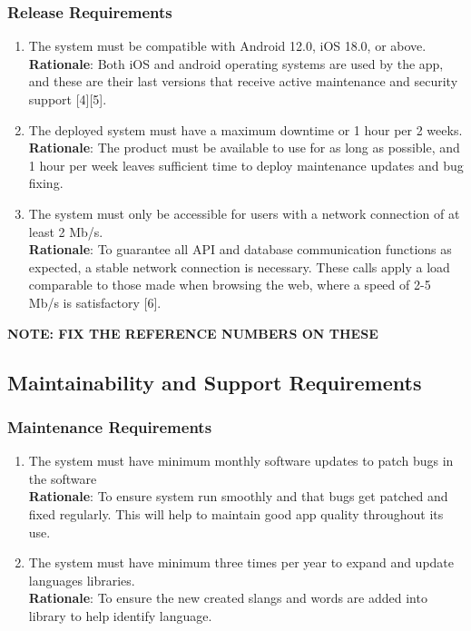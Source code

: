 \subsubsection{Release Requirements}
\label{ssub:release_requirements}
\begin{enumerate}[{OE-R}1. ]
	\item The system must be compatible with Android 12.0, iOS 18.0, or above.
	\\ \textbf{Rationale}: Both iOS and android operating systems are used by the app, and these are their last versions that receive active maintenance and security support [4][5]. 
	\item The deployed system must have a maximum downtime or 1 hour per 2 weeks.
	\\ \textbf{Rationale}: The product must be available to use for as long as possible, and 1 hour per week leaves sufficient time to deploy maintenance updates and bug fixing.
	\item The system must only be accessible for users with a network connection of at least 2 Mb/s.
	\\ \textbf{Rationale}: To guarantee all API and database communication functions as expected, a stable network connection is necessary. These calls apply a load comparable to those made when browsing the web, where a speed of 2-5 Mb/s is satisfactory [6].
\end{enumerate}

\textbf{NOTE: FIX THE REFERENCE NUMBERS ON THESE}


\subsection{Maintainability and Support Requirements}
\label{sub:maintainability_and_support_requirements}

\subsubsection{Maintenance Requirements}
\label{ssub:maintenance_requirements}
\begin{enumerate}[{MS-M}1. ]
	\item The system must have minimum monthly software updates to patch bugs in the software  
	\\ \textbf{Rationale}: To ensure system 	run smoothly and that bugs get patched and fixed regularly. This will help to maintain 	good app quality throughout its use.
	\item The system must have minimum three times per year to expand and update languages libraries. 
	\\ \textbf{Rationale}: To ensure the new created slangs and words are added into library to help identify language.
\end{enumerate}

